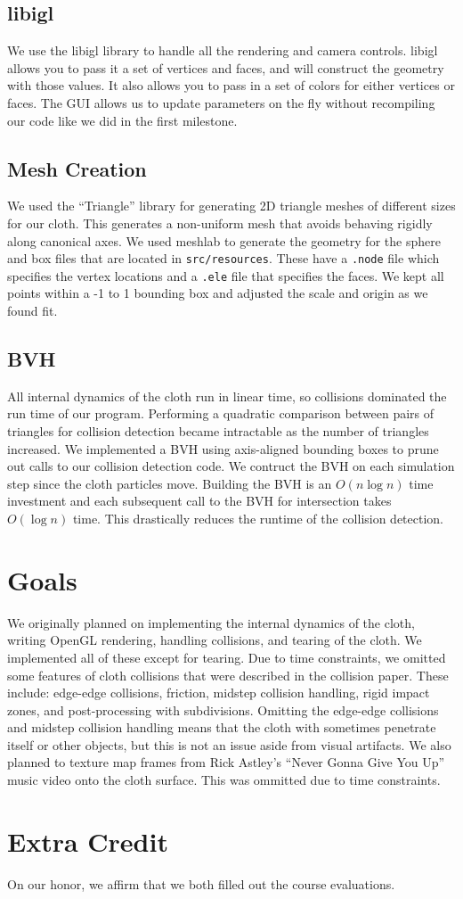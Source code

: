 \documentclass{article}
\def\code#1{\texttt{#1}}
\begin{document}
    \subsection{libigl}
    We use the libigl library to handle all the rendering and camera controls. libigl allows you to pass it a set of vertices and faces, and will construct the geometry with those values. It also allows you to pass in a set of colors for either vertices or faces. The GUI allows us to update parameters on the fly without recompiling our code like we did in the first milestone.
    \subsection{Mesh Creation}
    We used the ``Triangle'' library for generating 2D triangle meshes of different sizes for our cloth. This generates a non-uniform mesh that avoids behaving rigidly along canonical axes. We used meshlab to generate the geometry for the sphere and box files that are located in \code{src/resources}. These have a \code{.node} file which specifies the vertex locations and a \code{.ele} file that specifies the faces. We kept all points within a -1 to 1 bounding box and adjusted the scale and origin as we found fit.
    \subsection{BVH}
    All internal dynamics of the cloth run in linear time, so collisions dominated the run time of our program. Performing a quadratic comparison between pairs of triangles for collision detection became intractable as the number of triangles increased. We implemented a BVH using axis-aligned bounding boxes to prune out calls to our collision detection code. We contruct the BVH on each simulation step since the cloth particles move. Building the BVH is an $O(n \log n)$ time investment and each subsequent call to the BVH for intersection takes $O(\log n)$ time. This drastically reduces the runtime of the collision detection.
\section{Goals}
We originally planned on implementing the internal dynamics of the cloth, writing OpenGL rendering, handling collisions, and tearing of the cloth. We implemented all of these except for tearing. Due to time constraints, we omitted some features of cloth collisions that were described in the collision paper. These include: edge-edge collisions, friction, midstep collision handling, rigid impact zones, and post-processing with subdivisions. Omitting the edge-edge collisions and midstep collision handling means that the cloth with sometimes penetrate itself or other objects, but this is not an issue aside from visual artifacts. We also planned to texture map frames from Rick Astley's ``Never Gonna Give You Up'' music video onto the cloth surface. This was ommitted due to time constraints.

\section{Extra Credit}
On our honor, we affirm that we both filled out the course evaluations.
\end{document}
